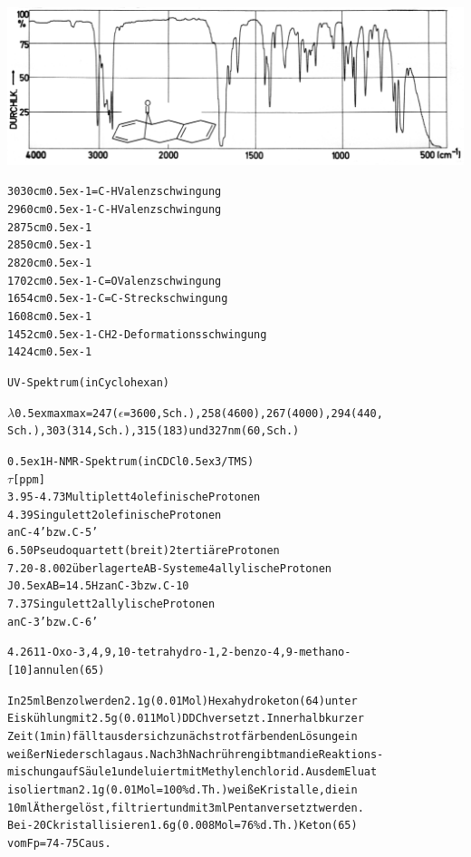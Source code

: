 \documentclass[a4paper,11pt]{article}
\begin{document}
\hspace*{-0.5cm}\includegraphics[width=14.9cm]{IR_055}
\begin{alltt}

3030 cm\raise0.5ex\hbox{-1} =C-H Valenzschwingung
2960 cm\raise0.5ex\hbox{-1} -C-H Valenzschwingung
2875 cm\raise0.5ex\hbox{-1}
2850 cm\raise0.5ex\hbox{-1}
2820 cm\raise0.5ex\hbox{-1}
1702 cm\raise0.5ex\hbox{-1} -C=O Valenzschwingung
1654 cm\raise0.5ex\hbox{-1} -C=C- Streckschwingung
1608 cm\raise0.5ex\hbox{-1}
1452 cm\raise0.5ex\hbox{-1} -CH2- Deformationsschwingung
1424 cm\raise0.5ex\hbox{-1}

UV-Spektrum (in Cyclohexan)

\(\lambda\)\lower0.5ex\hbox{max}max = 247 (\(\epsilon\) = 3600, Sch.), 258 (4600), 267 (4000), 294 (440,
Sch.), 303 (314, Sch.), 315 (183) und 327 nm (60, Sch.)

\newpage
{}


\leavevmode\raise0.5ex\hbox{1}H-NMR-Spektrum (in CDCl\lower0.5ex\hbox{3}/TMS)
  \(\tau\) [ppm]
3.95 - 4.73  Multiplett                4 olefinische Protonen
4.39         Singulett                 2 olefinische Protonen
                                         an C-4' bzw. C-5'
6.50         Pseudoquartett (breit)    2 tertiäre Protonen
7.20 - 8.00  2 überlagerte AB-Systeme  4 allylische Protonen
             J\lower0.5ex\hbox{AB} = 14.5 Hz               an C-3 bzw. C-10
7.37         Singulett                 2 allylische Protonen
                                         an C-3' bzw. C-6'


4.26 11-Oxo-3,4,9,10-tetrahydro-1,2-benzo-4,9-methano-
[10]annulen (65)

In 25 ml Benzol werden 2.1 g (0.01 Mol) Hexahydroketon (64) unter
Eiskühlung mit 2.5 g (0.011 Mol) DDCh versetzt. Innerhalb kurzer
Zeit (1 min) fällt aus der sich zunächst rot färbenden Lösung ein
weißer Niederschlag aus. Nach 3 h Nachrühren gibt man die Reaktions-
mischung auf Säule 1 und eluiert mit Methylenchlorid. Aus dem Eluat
isoliert man 2.1 g (0.01 Mol = 100 \% d.Th.) weiße Kristalle, die in
10 ml Äther gelöst, filtriert und mit 3 ml Pentan versetzt werden.
Bei -20\degree{}C kristallisieren 1.6 g (0.008 Mol = 76 \% d.Th.) Keton (65)
vom Fp = 74 - 75\degree{}C aus.


\end{alltt}
\end{document}

